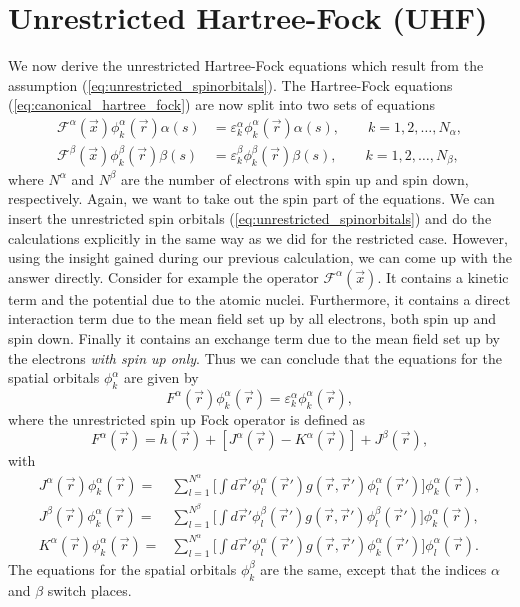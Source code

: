 \section{Unrestricted Hartree-Fock (UHF)}
\label{sec:UHF}
We now derive the unrestricted Hartree-Fock equations which result from the assumption (\ref{eq:unrestricted_spinorbitals}). The Hartree-Fock equations (\ref{eq:canonical_hartree_fock})
are now split into two sets of equations
\begin{align}
\mathcal F^\alpha(\vec x) \phi^\alpha_k(\vec r)\alpha(s) & = \varepsilon^\alpha_k\phi^\alpha_k(\vec r)\alpha(s), \qquad k=1,2,\dots, N_\alpha, \\
\mathcal F^\beta(\vec x) \phi^\beta_k(\vec r)\beta(s) & = \varepsilon^\beta_k\phi^\beta_k(\vec r)\beta(s), \qquad k=1,2,\dots, N_\beta,
\end{align}
where $N^\alpha$ and $N^\beta$ are the number of electrons with spin up and spin down, respectively.
Again, we want to take out the spin part of the equations. We can insert the unrestricted spin orbitals (\ref{eq:unrestricted_spinorbitals}) and do the calculations
explicitly in the same way as we did for the restricted case. However, using the insight gained during our previous calculation, we can come up with the answer directly. Consider
for example the operator $\mathcal F^\alpha(\vec x)$. It contains a kinetic term and the potential due to the atomic nuclei. Furthermore, it contains
a direct interaction term due to the mean field set up by all electrons, both spin up and spin down. Finally it contains an exchange term due to the mean field
set up by the electrons \emph{with spin up only}. Thus we can conclude that the equations for the spatial orbitals $\phi^\alpha_k$ are given by
\begin{equation}
\label{eq:HF^alpha}
 F^\alpha(\vec r)\phi^\alpha_k(\vec r) = \varepsilon^\alpha_k\phi^\alpha_k(\vec r),
\end{equation}
where the unrestricted spin up Fock operator is defined as
\begin{equation}
\label{eq:Foperator^alpha}
 F^\alpha(\vec r) = h(\vec r) + [J^\alpha(\vec r) - K^\alpha(\vec r)] + J^\beta(\vec r),
\end{equation}
with
\begin{align}
 J^\alpha(\vec r)\phi^\alpha_k(\vec r) = & \sum_{l=1}^{N^\alpha}\Big[\int d\vec r' \phi^\alpha_l(\vec r')g(\vec r, \vec r')\phi^\alpha_l(\vec r')\Big]\phi^\alpha_k(\vec r), \\
 J^\beta(\vec r)\phi^\alpha_k(\vec r) = & \sum_{l=1}^{N^\beta}\Big[\int d\vec r' \phi^\beta_l(\vec r')g(\vec r, \vec r')\phi^\beta_l(\vec r')\Big]\phi^\alpha_k(\vec r), \\
 K^\alpha(\vec r)\phi^\alpha_k(\vec r) = & \sum_{l=1}^{N^\alpha}\Big[\int d\vec r' \phi^\alpha_l(\vec r')g(\vec r, \vec r')\phi^\alpha_k(\vec r')\Big]\phi^\alpha_l(\vec r).
\end{align}
The equations for the spatial orbitals $\phi^\beta_k$ are the same, except that the indices $\alpha$ and $\beta$ switch places.


